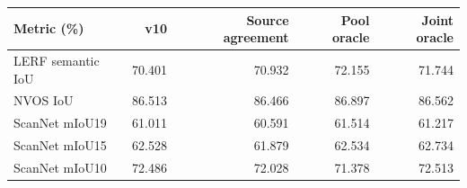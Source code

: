 \begin{tabular}{lrrrr}
\toprule
Metric (\%) & v10 & Source agreement & Pool oracle & Joint oracle \\
\midrule
LERF semantic IoU & 70.401 & 70.932 & 72.155 & 71.744 \\
NVOS IoU & 86.513 & 86.466 & 86.897 & 86.562 \\
ScanNet mIoU19 & 61.011 & 60.591 & 61.514 & 61.217 \\
ScanNet mIoU15 & 62.528 & 61.879 & 62.534 & 62.734 \\
ScanNet mIoU10 & 72.486 & 72.028 & 71.378 & 72.513 \\
\bottomrule
\end{tabular}
